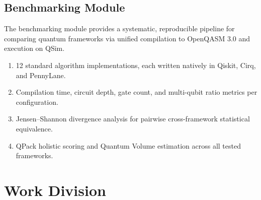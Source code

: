 \subsection{Benchmarking Module}
The benchmarking module provides a systematic, reproducible pipeline for comparing quantum frameworks via unified compilation to OpenQASM 3.0 and execution on QSim.
\begin{enumerate}
    \item 12 standard algorithm implementations, each written natively in Qiskit, Cirq, and PennyLane.
    \item Compilation time, circuit depth, gate count, and multi-qubit ratio metrics per configuration.
    \item Jensen--Shannon divergence analysis for pairwise cross-framework statistical equivalence.
    \item QPack holistic scoring and Quantum Volume estimation across all tested frameworks.
\end{enumerate}

\section{Work Division}

